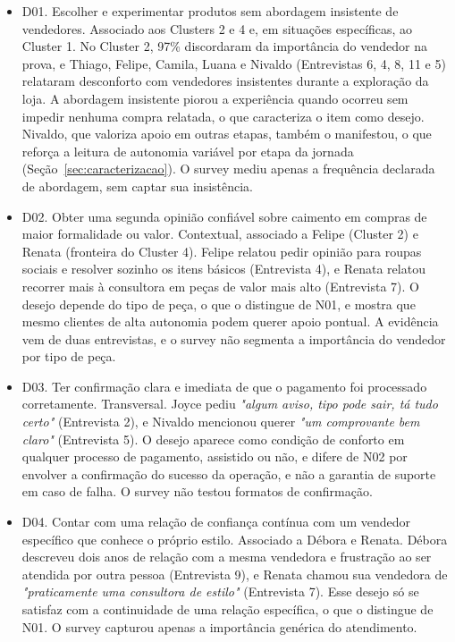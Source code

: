 \begin{itemize}
    \item D01. Escolher e experimentar produtos sem abordagem insistente de vendedores. Associado aos Clusters 2 e 4 e, em situações específicas, ao Cluster 1. No Cluster 2, 97\% discordaram da importância do vendedor na prova, e Thiago, Felipe, Camila, Luana e Nivaldo (Entrevistas 6, 4, 8, 11 e 5) relataram desconforto com vendedores insistentes durante a exploração da loja. A abordagem insistente piorou a experiência quando ocorreu sem impedir nenhuma compra relatada, o que caracteriza o item como desejo. Nivaldo, que valoriza apoio em outras etapas, também o manifestou, o que reforça a leitura de autonomia variável por etapa da jornada (Seção~\ref{sec:caracterizacao}). O survey mediu apenas a frequência declarada de abordagem, sem captar sua insistência.

    \item D02. Obter uma segunda opinião confiável sobre caimento em compras de maior formalidade ou valor. Contextual, associado a Felipe (Cluster 2) e Renata (fronteira do Cluster 4). Felipe relatou pedir opinião para roupas sociais e resolver sozinho os itens básicos (Entrevista 4), e Renata relatou recorrer mais à consultora em peças de valor mais alto (Entrevista 7). O desejo depende do tipo de peça, o que o distingue de N01, e mostra que mesmo clientes de alta autonomia podem querer apoio pontual. A evidência vem de duas entrevistas, e o survey não segmenta a importância do vendedor por tipo de peça.

    \item D03. Ter confirmação clara e imediata de que o pagamento foi processado corretamente. Transversal. Joyce pediu \emph{"algum aviso, tipo pode sair, tá tudo certo"} (Entrevista 2), e Nivaldo mencionou querer \emph{"um comprovante bem claro"} (Entrevista 5). O desejo aparece como condição de conforto em qualquer processo de pagamento, assistido ou não, e difere de N02 por envolver a confirmação do sucesso da operação, e não a garantia de suporte em caso de falha. O survey não testou formatos de confirmação.

    \item D04. Contar com uma relação de confiança contínua com um vendedor específico que conhece o próprio estilo. Associado a Débora e Renata. Débora descreveu dois anos de relação com a mesma vendedora e frustração ao ser atendida por outra pessoa (Entrevista 9), e Renata chamou sua vendedora de \emph{"praticamente uma consultora de estilo"} (Entrevista 7). Esse desejo só se satisfaz com a continuidade de uma relação específica, o que o distingue de N01. O survey capturou apenas a importância genérica do atendimento.


\end{itemize}
